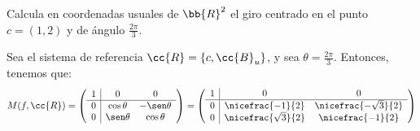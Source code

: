 \begin{ejercicio}
    Calcula en coordenadas usuales de $\bb{R}^2$ el giro centrado en el punto $c = (1, 2)$ y de ángulo $\frac{2\pi}{3}$.

    Sea el sistema de referencia $\cc{R}=\{c, \cc{B}_u\}$, y sea $\theta = \frac{2\pi}{3}$. Entonces, tenemos que:
    \begin{equation*}
        M(f, \cc{R}) = \left(\begin{array}{c|cc}
            1 & 0 & 0 \\ \hline
            0 & \cos\theta & -\sen\theta \\
            0 & \sen\theta & \cos\theta
        \end{array}\right)
        = \left(\begin{array}{c|cc}
            1 & 0 & 0 \\ \hline
            0 & \nicefrac{-1}{2} & \nicefrac{-\sqrt{3}}{2} \\
            0 & \nicefrac{\sqrt{3}}{2} & \nicefrac{-1}{2}
        \end{array}\right)
    \end{equation*}


\end{ejercicio}
